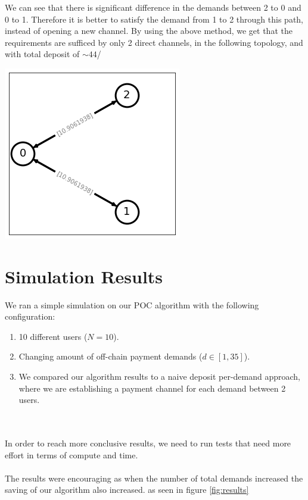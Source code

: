 \documentclass{cup-ino}
\begin{document}
We can see that there is significant difference in the demands between 2 to 0 and 0 to 1. Therefore it is better to satisfy the demand from 1 to 2 through this path, instead of opening a new channel.
By using the above method, we get that the requirements are sufficed by only 2 direct channels, in the following topology, and with total deposit of $\sim 44$/\\
\begin{center}
\includegraphics[scale=0.5]{img1.png}
\end{center}


\newpage
\section{Simulation Results}
We ran a simple simulation on our POC algorithm with the following configuration: 
\begin{enumerate}
    \item 10 different users ($N = 10$).
    \item Changing amount of off-chain payment demands ($d \in [1, 35]$).
    \item We compared our algorithm results to a naive deposit per-demand approach, where we are establishing a payment channel for each demand between 2 users.
\end{enumerate}

\\\\
In order to reach more conclusive results, we need to run tests that need more effort in terms of compute and time.\\\\

The results were encouraging as when the number of total demands increased the saving of our algorithm also increased. as seen in figure \ref{fig:results}
\end{document}
